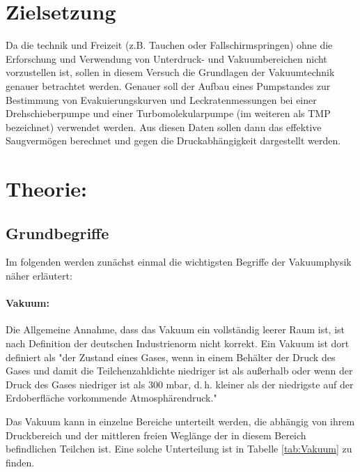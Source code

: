 \section{Zielsetzung}
\label{sec:Zielsetzung}
Da die technik und Freizeit (z.B. Tauchen oder Fallschirmspringen) ohne die Erforschung und Verwendung von Unterdruck- und Vakuumbereichen nicht vorzustellen
ist, sollen in diesem Versuch die Grundlagen der Vakuumtechnik genauer betrachtet werden.
Genauer soll der Aufbau eines Pumpstandes zur Bestimmung von Evakuierungskurven und Leckratenmessungen
bei einer Drehschieberpumpe und einer Turbomolekularpumpe (im weiteren als TMP bezeichnet) verwendet werden.
Aus diesen Daten sollen dann das effektive Saugvermögen berechnet und gegen die Druckabhängigkeit dargestellt werden.


\section{Theorie:}
\label{sec:Theorie}
\subsection{Grundbegriffe}

Im folgenden werden zunächst einmal die wichtigsten Begriffe der Vakuumphysik näher erläutert:
\paragraph{Vakuum:}
Die Allgemeine Annahme, dass das Vakuum ein vollständig leerer Raum ist, ist nach Definition der
deutschen Industrienorm nicht korrekt.
Ein Vakuum ist dort definiert als "der Zustand eines Gases, wenn in einem Behälter der
Druck des Gases und damit die Teilchenzahldichte niedriger ist als außerhalb oder wenn der Druck
des Gases niedriger ist als 300 mbar, d. h. kleiner als der niedrigste auf der Erdoberfläche
vorkommende Atmosphärendruck."\cite{vakuum}

Das Vakuum kann in einzelne Bereiche unterteilt werden, die abhängig von ihrem Druckbereich und der mittleren
freien Weglänge der in diesem Bereich befindlichen Teilchen ist.
Eine solche Unterteilung ist in Tabelle \ref{tab:Vakuum} zu finden.

